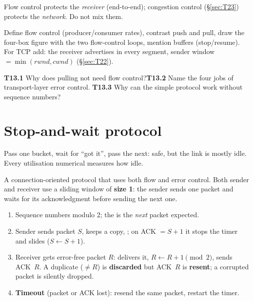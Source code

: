 \begin{warningbox}
Flow control protects the \emph{receiver} (end-to-end); congestion control (\S\ref{sec:T23}) protects the \emph{network}. Do not mix them.
\end{warningbox}

\begin{answerplan}
Define flow control (producer/consumer rates), contrast push and pull, draw the four-box figure with the two flow-control loops, mention buffers
(stop/resume). For TCP add: the receiver advertises  in every segment, sender window $=\min(rwnd,cwnd)$ (\S\ref{sec:T22}).
\par{} \textbf{T13.1} Why does pulling not need flow control?\quad \textbf{T13.2} Name the four jobs of transport-layer error control.\quad
\textbf{T13.3} Why can the simple protocol work without sequence numbers?
\end{answerplan}

\section{Stop-and-wait protocol}\label{sec:T14}
  

\begin{intuitionbox}
Pass one bucket, wait for ``got it'', pass the next: safe, but the link is mostly idle. Every utilisation numerical measures how idle.
\end{intuitionbox}

\begin{definitionbox}
A connection-oriented protocol that uses both flow and error control. Both sender and receiver use a sliding window of
\textbf{size 1}: the sender sends one packet and waits for its acknowledgment before sending the next one. 
\end{definitionbox}

\begin{algorithmbox}[Stop-and-wait ($S$ = sender's next number, $R$ = receiver's expected number)]
\begin{enumerate}
  \item Sequence numbers modulo 2; the  is the \emph{next} packet expected.
  \item Sender sends packet $S$, keeps a copy, ; on \textsf{ACK} $=S+1$ it stops the timer and slides ($S\leftarrow S+1$).
  \item Receiver gets error-free packet $R$: delivers it, $R\leftarrow R+1 \pmod 2$, sends \textsf{ACK}~$R$. A duplicate ($\neq R$) is \textbf{discarded} but \textsf{ACK}~$R$ is \textbf{resent}; a corrupted packet is silently dropped.
  \item \textbf{Timeout} (packet or ACK lost): resend the same packet, restart the timer.
\end{enumerate}
\end{algorithmbox}

